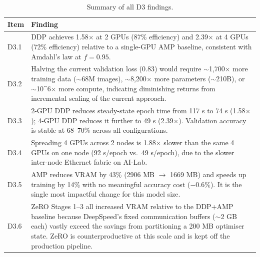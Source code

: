 \begin{table}[h]
\centering
\caption{Summary of all D3 findings.}
\label{tab:d3_summary}
\begin{tabular}{lp{9cm}}
\toprule
\textbf{Item} & \textbf{Finding} \\
\midrule
D3.1 & DDP achieves 1.58$\times$ at 2 GPUs (87\% efficiency) and 2.39$\times$
       at 4 GPUs (72\% efficiency) relative to a single-GPU AMP baseline,
       consistent with Amdahl's law at $f = 0.95$. \\
D3.2 & Halving the current validation loss (0.83) would require
       $\sim$1{,}700$\times$ more training data ($\sim$68M images),
       $\sim$8{,}200$\times$ more parameters ($\sim$210B), or
       $\sim$10^6$\times$ more compute, indicating diminishing returns
       from incremental scaling of the current approach. \\
D3.3 & 2-GPU DDP reduces steady-state epoch time from 117 s to 74 s
       (1.58$\times$); 4-GPU DDP reduces it further to 49 s (2.39$\times$).
       Validation accuracy is stable at 68–70\% across all configurations. \\
D3.4 & Spreading 4 GPUs across 2 nodes is 1.88$\times$ slower than the
       same 4 GPUs on one node (92 s/epoch vs.\ 49 s/epoch),
       due to the slower inter-node Ethernet fabric on AI-Lab. \\
D3.5 & AMP reduces VRAM by 43\% (2906 MB $\to$ 1669 MB) and speeds up
       training by 14\% with no meaningful accuracy cost ($-$0.6\%).
       It is the single most impactful change for this model size. \\
D3.6 & ZeRO Stages 1–3 all increased VRAM relative to the DDP+AMP
       baseline because DeepSpeed's fixed communication buffers
       ($\sim$2 GB each) vastly exceed the savings from partitioning a
       200 MB optimiser state. ZeRO is counterproductive at this scale
       and is kept off the production pipeline. \\
\bottomrule
\end{tabular}
\end{table}

